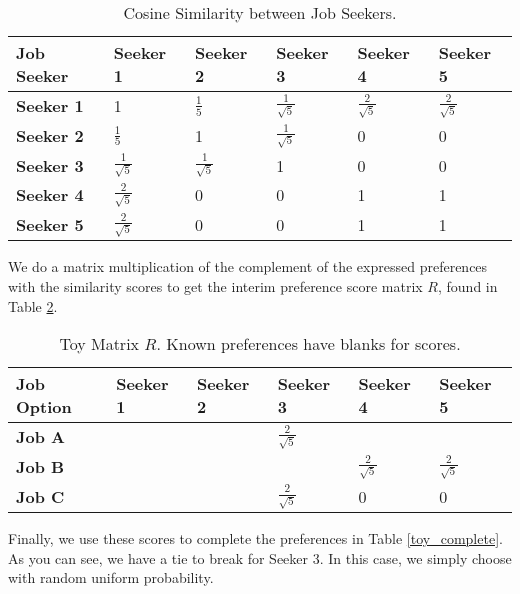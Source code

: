 \begin{table}[h!]
\begin{center}
\caption{Cosine Similarity between Job Seekers.}
\label{toy_similarity}
\begin{tabular}{l|l|l|l|l|l}
\hline 
\textbf{Job Seeker} & \textbf{Seeker 1} &  \textbf{Seeker 2} & \textbf{Seeker 3} &\textbf{Seeker 4} &\textbf{Seeker 5} \\
\hline
\textbf{Seeker 1} & 1 & $\frac{1}{5}$ & $\frac{1}{\sqrt{5}}$ & $\frac{2}{\sqrt{5}}$ & $\frac{2}{\sqrt{5}}$\\
\textbf{Seeker 2} & $\frac{1}{5}$ & 1 & $\frac{1}{\sqrt{5}}$ & 0 & 0 \\
\textbf{Seeker 3} &  $\frac{1}{\sqrt{5}}$ & $\frac{1}{\sqrt{5}}$ & 1 & 0 & 0 \\
\textbf{Seeker 4} & $\frac{2}{\sqrt{5}}$ & 0  & 0 & 1 & 1 \\
\textbf{Seeker 5} & $\frac{2}{\sqrt{5}}$ & 0  & 0 & 1 & 1\\
\hline 
\end{tabular}
\end{center}
\end{table}

We do a matrix multiplication of the complement of the expressed preferences with the similarity scores to get the interim preference score matrix $R$, found in Table \ref{toy_scores}.

\begin{table}[h!]
\begin{center}
\caption{Toy Matrix $R$. Known preferences have blanks for scores.}
\label{toy_scores}
\begin{tabular}{l|l|l|l|l|l}
\hline 
\textbf{Job Option} & \textbf{Seeker 1} &  \textbf{Seeker 2} & \textbf{Seeker 3} &\textbf{Seeker 4} &\textbf{Seeker 5} \\
\hline
\textbf{Job A} &  &  & $\frac{2}{\sqrt{5}}$ &  & \\
\textbf{Job B} &  &  &  &$\frac{2}{\sqrt{5}}$ &$\frac{2}{\sqrt{5}}$\\
\textbf{Job C} &  &  & $\frac{2}{\sqrt{5}}$ &0 & 0\\
\hline 
\end{tabular}
\end{center}
\end{table}

Finally, we use these scores to complete the preferences in Table \ref{toy_complete}. As you can see, we have a tie to break for Seeker 3. In this case, we simply choose with random uniform probability.


